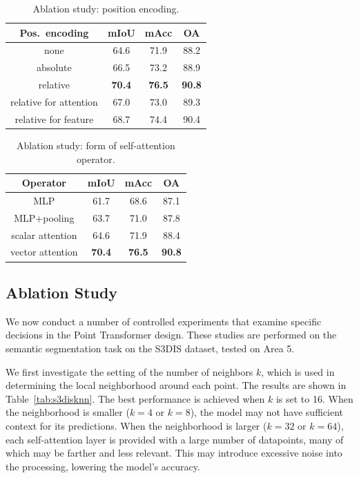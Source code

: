 \begin{table}
	\centering
		\begin{tabular}{ c | c c c }
			\toprule[1pt]
			Pos.\ encoding & mIoU & mAcc & OA \\
			\hline
			none & 64.6 & 71.9 & 88.2 \\
			absolute & 66.5 & 73.2 & 88.9 \\
			relative & \textbf{70.4} & \textbf{76.5} & \textbf{90.8} \\
			relative for attention & 67.0 & 73.0 & 89.3 \\
			relative for feature & 68.7 & 74.4 & 90.4 \\
			\bottomrule[1pt]
		\end{tabular}
	\caption{Ablation study: position encoding.}
	\label{tab:s3disposition}
\end{table}

\begin{table}
	\centering
		\begin{tabular}{ c | c c c }
			\toprule[1pt]
			Operator & mIoU & mAcc & OA \\
			\hline
			MLP & 61.7 & 68.6 & 87.1 \\
			MLP+pooling & 63.7 & 71.0 & 87.8 \\
			\hline
			scalar attention & 64.6 & 71.9 & 88.4 \\
			vector attention & \textbf{70.4} & \textbf{76.5} & \textbf{90.8} \\
			\bottomrule[1pt]
		\end{tabular}
	\caption{Ablation study: form of self-attention operator.}
	\label{tab:s3disattention}
\end{table}

\subsection{Ablation Study}
\label{sec:ablation}

We now conduct a number of controlled experiments that examine specific decisions in the Point Transformer design. These studies are performed on the semantic segmentation task on the S3DIS dataset, tested on Area 5.

We first investigate the setting of the number of neighbors $k$, which is used in determining the local neighborhood around each point. The results are shown in Table~\ref{tab:s3disknn}. The best performance is achieved when $k$ is set to 16. When the neighborhood is smaller ($k=4$ or $k=8$), the model may not have sufficient context for its predictions. When the neighborhood is larger ($k=32$ or $k=64$), each self-attention layer is provided with a large number of datapoints, many of which may be farther and less relevant. This may introduce excessive noise into the processing, lowering the model's accuracy.

